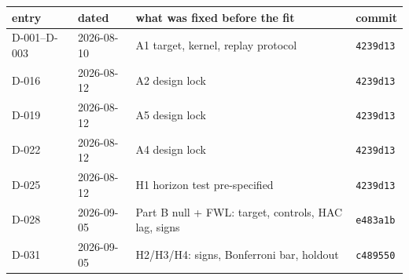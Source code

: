 \begin{tabular}{llp{7.2cm}l}
\toprule
entry & dated & what was fixed before the fit & commit \\
\midrule
  D-001--D-003 & 2026-08-10 & A1 target, kernel, replay protocol & \texttt{4239d13} \\
  D-016 & 2026-08-12 & A2 design lock & \texttt{4239d13} \\
  D-019 & 2026-08-12 & A5 design lock & \texttt{4239d13} \\
  D-022 & 2026-08-12 & A4 design lock & \texttt{4239d13} \\
  D-025 & 2026-08-12 & H1 horizon test pre-specified & \texttt{4239d13} \\
  D-028 & 2026-09-05 & Part B null + FWL: target, controls, HAC lag, signs & \texttt{e483a1b} \\
  D-031 & 2026-09-05 & H2/H3/H4: signs, Bonferroni bar, holdout & \texttt{c489550} \\
\bottomrule
\end{tabular}
